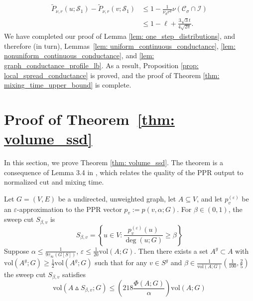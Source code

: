 \documentclass[11pt,twoside]{article}
\newcommand{\set}[1]{\left\{#1\right\}}
\newcommand{\vol}{\mathrm{vol}}
\newcommand{\1}{\mathbbm{1}}
\newcommand{\Sset}{\mathcal{S}}
\newcommand{\Cset}{\mathcal{C}}
\newcommand{\Csig}{\Cset_{\sigma}}
\begin{document}
\begin{align*}
\widetilde{P}_{\nu,r}(u; \Sset_1) - \widetilde{P}_{\nu,r}(v; \Sset_1) & \leq  1 - \frac{1}{\nu_d r^d} \nu(\Csig \cap \mathcal{I}) \\
& \leq 1 - \ell + \frac{3 \sqrt{3} t}{4\sqrt{2\pi}}.
\end{align*}
We have completed our proof of Lemma \ref{lem: one_step_distributions}, and therefore (in turn), Lemmas~\ref{lem: uniform_continuous_conductance}, \ref{lem: nonuniform_continuous_conductance}, and \ref{lem: graph_conductance_profile_lb}. As a result, Proposition \ref{prop: local_spread_conductance} is proved, and the proof of Theorem \ref{thm: mixing_time_upper_bound} is complete.

\section{Proof of Theorem~\ref{thm: volume_ssd}}
\label{sec:proof_of_volume_ssd}

In this section, we prove Theorem \ref{thm: volume_ssd}. The theorem is a consequence of Lemma 3.4 in \citet{zhu2013}, which relates the quality of the PPR output to normalized cut and mixing time. 
\begin{lemma}
	\label{lem:zhu}
	Let $G = (V,E)$ be a undirected, unweighted graph, let $A \subseteq V$, and let $p_v^{(\varepsilon)}$ be an $\varepsilon$-approximation to the PPR vector $p_v := p(v,\alpha;G)$. For $\beta \in (0,1)$,  the sweep cut $S_{\beta,v}$ is
	\begin{equation*}
	S_{\beta,v} = \set{u \in V: \frac{p_v^{(\varepsilon)}(u)}{\deg(u;G)} \geq \beta}
	\end{equation*} Suppose $\alpha \leq \frac{1}{9 \tau_{\infty}(G[S])}$,  $\varepsilon \leq \frac{1}{20}\vol(A;G)$. Then there exists a set $A^g \subset A$ with $\vol(A^g;G) \geq \frac{1}{2}\vol(A^g;G)$ such that for any $v \in S^g$ and $\beta \in \frac{1}{\vol(A;G)}(\frac{1}{100},\frac{2}{5})$ the sweep cut $S_{\beta,v}$ satisfies
	\begin{equation*}
	\vol(A \vartriangle S_{\beta,v};G) \leq \left(218\frac{\Phi(A;G)}{\alpha}\right) \vol(A;G)
	\end{equation*}
\end{lemma}
\end{document}
